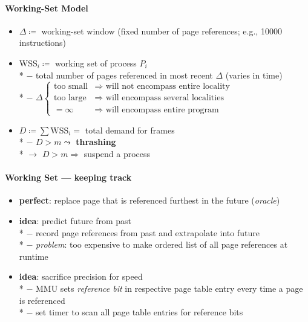 \paragraph{Working-Set Model}
\begin{itemize}
  \item $ \Delta \coloneqq $ working-set window (fixed number of page references; e.g., 10000 instructions)
  \item $ \text{WSS}_i \coloneqq $ working set of process $ P_i $ \\*
    $ - $ total number of pages referenced in most recent $ \Delta $ (varies in time) \\*
    $ - $ $ \Delta \begin{cases}
      \text{too small} &\Rightarrow \text{ will not encompass entire locality} \\
      \text{too large} &\Rightarrow \text{ will encompass several localities} \\
      = \infty &\Rightarrow \text{ will encompass entire program}
    \end{cases} $
  \item $ D \coloneqq \sum \text{WSS}_i = $ total demand for frames \\*
    $ - $ $ D > m \leadsto $ \textbf{thrashing} \\*
    $ \to $ $ D > m \Rightarrow $ suspend a process
\end{itemize}

\paragraph{Working Set --- keeping track}
\begin{itemize}
  \item \textbf{perfect}: replace page that is referenced furthest in the future (\emph{oracle})
  \item \textbf{idea}: predict future from past \\*
    $ - $ record page references from past and extrapolate into future \\*
    $ - $ \emph{problem}: too expensive to make ordered list of all page references at runtime
  \item \textbf{idea}: sacrifice precision for speed \\*
    $ - $ MMU sets \emph{reference bit} in respective page table entry every time a page is referenced \\*
    $ - $ set timer to scan all page table entries for reference bits
\end{itemize}

